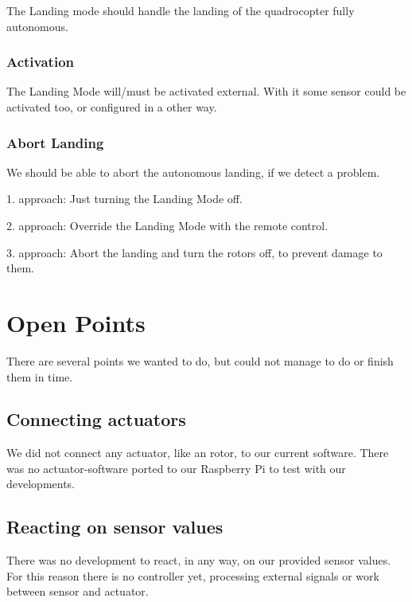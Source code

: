 The Landing mode should handle the landing of the quadrocopter fully autonomous.

\subsection{Activation}

The Landing Mode will/must be activated external. With it some sensor could be activated too, or configured in a other way. 


\subsection{Abort Landing}

We should be able to abort the autonomous landing, if we detect a problem.

1. approach: Just turning the Landing Mode off.

2. approach: Override the Landing Mode with the remote control.

3. approach: Abort the landing and turn the rotors off, to prevent damage to them.







\chapter{Open Points}
\label{sec:ergeb}

There are several points we wanted to do, but could not manage to do or finish them in time.

\section{Connecting actuators}

We did not connect any actuator, like an rotor, to our current software. There was no actuator-software ported to our Raspberry Pi to test with our developments.



\section{Reacting on sensor values}

There was no development to react, in any way, on our provided sensor values.\\
For this reason there is no controller yet, processing external signals or work between sensor and actuator.





